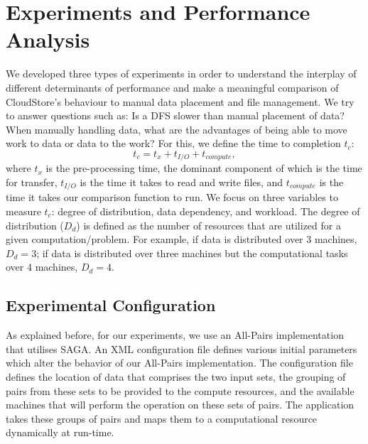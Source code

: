 \documentclass{rspublic}
\begin{document}
\section{Experiments and Performance Analysis} 
We developed three types of experiments in order to understand the
interplay of different determinants of performance and make a
meaningful comparison of CloudStore's behaviour to manual data
placement and file management. We try to answer questions such as: Is
a DFS slower than manual placement of data?  When manually handling
data, what are the advantages of being able to move work to data or
data to the work? For this, we define the time to completion $t_c$:
 \begin{equation}
t_c = t_x + t_{I/O} + t_{compute},
\end{equation}
where $t_x$ is the pre-processing time, the dominant component of which is
the time for transfer, $t_{I/O}$ is the time it takes to read and write
files, and $t_{compute}$ is the time it takes our comparison function to
run. We focus on three variables to measure $t_c$: degree of
distribution, data dependency, and workload. The degree of distribution
($D_d$) is defined as the number of resources that are utilized for a
given computation/problem. For example, if data is distributed over 3
machines, $D_d=3$; if data is distributed over three machines but the
computational tasks over 4 machines, $D_d=4$.

\vspace{-0.3cm}

\subsection{Experimental Configuration}

As explained before, for our experiments, we use an All-Pairs
implementation that utilises SAGA. An XML configuration file defines
various initial parameters which alter the behavior of our All-Pairs
implementation. The configuration file defines the location of data that
comprises the two input sets, the grouping of pairs from these sets to
be provided to the compute resources, and the available machines that
will perform the operation on these sets of pairs. The application takes
these groups of pairs and maps them to a computational resource
dynamically at run-time.
\end{document}
